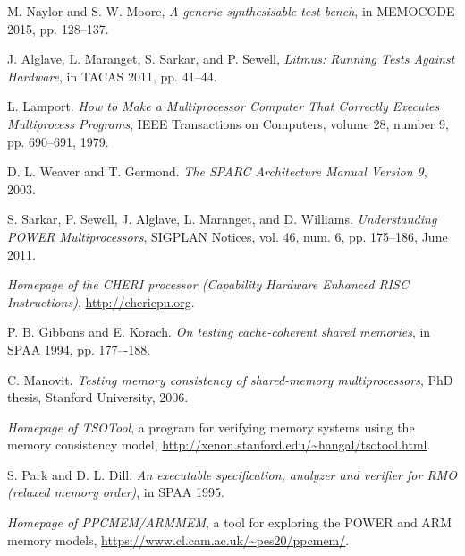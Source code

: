 \documentclass[11pt]{article}
\begin{document}
\begin{thebibliography}{99}
\setlength{\itemsep}{1pt}

 M. Naylor and S. W. Moore, \emph{A generic
synthesisable test bench}, in MEMOCODE 2015, pp. 128--137.

 J. Alglave, L. Maranget, S. Sarkar, and P.
Sewell, \emph{Litmus: Running Tests Against Hardware}, in TACAS 2011,
pp. 41--44.

 L. Lamport.  \emph{How to Make a Multiprocessor Computer
That Correctly Executes Multiprocess Programs}, IEEE Transactions on
Computers, volume 28, number 9, pp. 690--691, 1979.

 D. L. Weaver and T. Germond. \emph{ The SPARC
Architecture Manual Version 9}, 2003.

 S. Sarkar, P. Sewell, J.  Alglave, L. Maranget, and D.
Williams. \emph{Understanding POWER Multiprocessors}, SIGPLAN Notices,
vol. 46, num. 6, pp. 175--186, June 2011.

 \emph{Homepage of the CHERI processor (Capability
Hardware Enhanced RISC Instructions)}, \url{http://chericpu.org}.

 P. B.  Gibbons and E. Korach.  \emph{On testing
cache-coherent shared memories}, in SPAA 1994, pp.  177–-188.

 C. Manovit. \emph{Testing memory consistency of
shared-memory multiprocessors}, PhD thesis, Stanford University, 2006.

 \emph{Homepage of TSOTool}, a program for verifying
memory systems using the memory consistency model,
\url{http://xenon.stanford.edu/~hangal/tsotool.html}.

 S. Park and D. L. Dill.  \emph{ An executable
specification, analyzer and verifier for RMO (relaxed memory order)},
in SPAA 1995.

 \emph{Homepage of PPCMEM/ARMMEM},
a tool for exploring the POWER and ARM memory models,
\url{https://www.cl.cam.ac.uk/~pes20/ppcmem/}.





\end{thebibliography}
\end{document}
